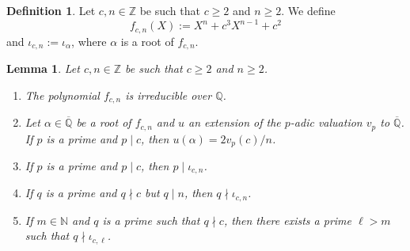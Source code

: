\documentclass{article}
\newtheorem{Lem}[equation]{Lemma}
\theoremstyle{definition}\newtheorem{Def}[equation]{Definition}
\theoremstyle{definition}\newtheorem{Ques}[equation]{Question}
\theoremstyle{definition}\newtheorem{Conj}[equation]{Conjecture}
\theoremstyle{definition}\newtheorem{Not}[equation]{Notation}
\newcommand{\N}{\mathbb{N}}
\newcommand{\Q}{\mathbb{Q}}
\newcommand{\oQ}{\overline{\Q}}
\newcommand{\Z}{\mathbb{Z}}
\newcommand{\rc}{ \color{red}}
\numberwithin{equation}{section}
\begin{document}
\begin{Def}\label{c,n polys} Let $c, n \in \Z$ be such that $c \geq 2$ and $n \geq 2$. We define $$f_{c,n}(X):= X^n + c^3 X^{n-1} + c^2$$ and $\iota_{c,n} := \iota_\alpha$, where $\alpha$ is a root of $f_{c,n}$.
\end{Def}

\begin{Lem}\label{c^3 polys}
Let $c, n \in \Z$ be such that $c \geq 2$ and $n \geq 2$.
\begin{enumerate}[(1)]%
\item The polynomial $f_{c,n}$ is irreducible over $\Q$.

\item Let $\alpha\in\oQ$ be a root of $f_{c,n}$ and $u$ an extension of the $p$-adic valuation $v_p$ to $\oQ$. If $p$ is a prime and $p \mid c$, then $u(\alpha) = 2v_p(c)/n$.

\item If $p$ is a prime and $p \mid c$, then $p \mid \iota_{c,n}$.

\item If $q$ is a prime and $q \nmid c$ but $q \mid n$, then $q \nmid \iota_{c,n}$.

\item If $m\in\N$ and $q$ is a prime such that $q \nmid c$, then there exists a prime $\ell>m$ such that $q \nmid \iota_{c,\ell}$.
\end{enumerate}
\end{Lem}
\end{document}
